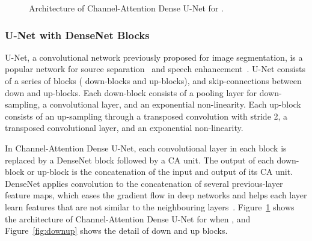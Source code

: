 \documentclass{article}
\begin{document}
\begin{figure}[htb]
\begin{minipage}[b]{1.0\linewidth}
	\end{minipage}
	\vspace*{-6mm}
	\caption{Architecture of Channel-Attention Dense U-Net for .}
	\label{fig:model}
	\vspace*{-7mm}
\end{figure}
\subsubsection{U-Net with DenseNet Blocks}
\label{sec:unet}
U-Net, a convolutional network previously proposed for image segmentation, is a popular network for source separation~\cite{waveUnet} and speech enhancement~\cite{phaseComplexUnet}. U-Net consists of a series of blocks ( down-blocks and  up-blocks), and skip-connections between down and up-blocks. Each down-block consists of a pooling layer for down-sampling, a convolutional layer, and an exponential non-linearity. Each up-block consists of an up-sampling through a transposed convolution with stride 2, a transposed convolutional layer, and an exponential non-linearity. 

In Channel-Attention Dense U-Net, each convolutional layer in each block is replaced by a DenseNet block followed by a CA unit. The output of each down-block or up-block is the concatenation of the input and output of its CA unit. DenseNet applies convolution to the concatenation of several previous-layer feature maps, which eases the gradient flow in deep networks and helps each layer learn features that are not similar to the neighbouring layers~\cite{takahashi2017multi}. Figure~\ref{fig:model} shows the architecture of Channel-Attention Dense U-Net for when , and Figure~\ref{fig:downup} shows the detail of down and up blocks.
\end{document}
